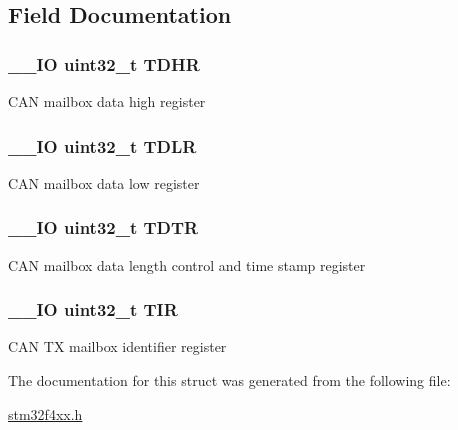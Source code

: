 \subsection{Field Documentation}
\hypertarget{struct_c_a_n___tx_mail_box___type_def_a90f7c1cf22683459c632d6040366eddf}{
\subsubsection[{T\-D\-H\-R}]{\setlength{\rightskip}{0pt plus 5cm}\-\_\-\-\_\-\-I\-O uint32\-\_\-t T\-D\-H\-R}}\label{struct_c_a_n___tx_mail_box___type_def_a90f7c1cf22683459c632d6040366eddf}
C\-A\-N mailbox data high register \hypertarget{struct_c_a_n___tx_mail_box___type_def_aded1359e1a32512910bff534d57ade68}{
\subsubsection[{T\-D\-L\-R}]{\setlength{\rightskip}{0pt plus 5cm}\-\_\-\-\_\-\-I\-O uint32\-\_\-t T\-D\-L\-R}}\label{struct_c_a_n___tx_mail_box___type_def_aded1359e1a32512910bff534d57ade68}
C\-A\-N mailbox data low register \hypertarget{struct_c_a_n___tx_mail_box___type_def_aed87bed042dd9523ce086119a3bab0ea}{
\subsubsection[{T\-D\-T\-R}]{\setlength{\rightskip}{0pt plus 5cm}\-\_\-\-\_\-\-I\-O uint32\-\_\-t T\-D\-T\-R}}\label{struct_c_a_n___tx_mail_box___type_def_aed87bed042dd9523ce086119a3bab0ea}
C\-A\-N mailbox data length control and time stamp register \hypertarget{struct_c_a_n___tx_mail_box___type_def_a6921aa1c578a7d17c6e0eb33a73b6630}{
\subsubsection[{T\-I\-R}]{\setlength{\rightskip}{0pt plus 5cm}\-\_\-\-\_\-\-I\-O uint32\-\_\-t T\-I\-R}}\label{struct_c_a_n___tx_mail_box___type_def_a6921aa1c578a7d17c6e0eb33a73b6630}
C\-A\-N T\-X mailbox identifier register 

The documentation for this struct was generated from the following file\-:\begin{DoxyCompactItemize}
\item 
\hyperlink{stm32f4xx_8h}{stm32f4xx.\-h}\end{DoxyCompactItemize}

